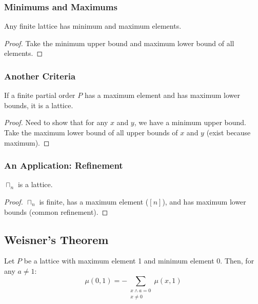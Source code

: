 \documentclass[letterpaper]{article}
\begin{document}
\subsubsection{Minimums and Maximums}
\begin{lemma}{}{}
    Any finite lattice has minimum and maximum elements. 
\end{lemma}

\begin{proof}
    Take the minimum upper bound and maximum lower bound of all elements.
\end{proof}

\subsubsection{Another Criteria}
\begin{lemma}{}{}
    If a finite partial order $P$ has a maximum element and has maximum lower bounds, it is a lattice. 
\end{lemma}

\begin{proof}
    Need to show that for any $x$ and $y$, we have a minimum upper bound. Take the maximum lower bound of all upper bounds of $x$ and $y$ (exist because maximum). 
\end{proof}

\subsubsection{An Application: Refinement}
\begin{corollary}{}{}
    $\sqcap_n$ is a lattice.    
\end{corollary}

\begin{proof}
    $\sqcap_n$ is finite, has a maximum element ($[n]$), and has maximum lower bounds (common refinement). 
\end{proof}


\subsection{Weisner's Theorem}
\begin{theorem}{}{}
    Let $P$ be a lattice with maximum element 1 and minimum element 0. Then, for any $a \neq 1$:
    \[\mu(0, 1) = -\sum_{\substack{x \wedge a = 0 \\ x \neq 0}} \mu(x, 1)\]
\end{theorem}
\end{document}
